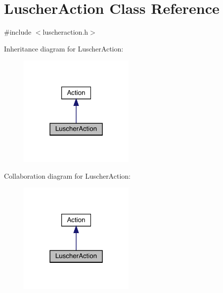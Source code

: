 \hypertarget{class_luscher_action}{}\section{Luscher\+Action Class Reference}
\label{class_luscher_action}


{\ttfamily \#include $<$luscheraction.\+h$>$}



Inheritance diagram for Luscher\+Action\+:\nopagebreak
\begin{figure}[H]
\begin{center}
\leavevmode
\includegraphics[width=159pt]{class_luscher_action__inherit__graph}
\end{center}
\end{figure}


Collaboration diagram for Luscher\+Action\+:\nopagebreak
\begin{figure}[H]
\begin{center}
\leavevmode
\includegraphics[width=159pt]{class_luscher_action__coll__graph}
\end{center}
\end{figure}
